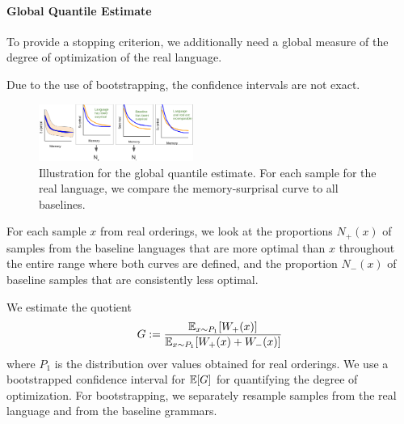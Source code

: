 \paragraph{Global Quantile Estimate}

To provide a stopping criterion, we additionally need a global measure of the degree of optimization of the real language.

Due to the use of bootstrapping, the confidence intervals are not exact.

\begin{figure}
	\begin{center}
\includegraphics[width=0.45\textwidth]{figures/quantile-global.png}
\end{center}
	\caption{Illustration for the global quantile estimate. For each sample for the real language, we compare the memory-surprisal curve to all baselines.}\label{fig:quantile-global}
\end{figure}



For each sample $x$ from real orderings, we look at the proportions $N_+(x)$ of samples from the baseline languages that are more optimal than $x$ throughout the entire range where both curves are defined, and the proportion $N_-(x)$ of baseline samples that are consistently less optimal.


We estimate the quotient
\begin{equation}\label{eq:g}
	G :=	\frac{\mathbb{E}_{x \sim P_1}[W_+(x)]}{\mathbb{E}_{x \sim P_1}[W_+(x) + W_-(x)]}
\end{equation}
where $P_1$ is the distribution over values obtained for real orderings.
We use a bootstrapped confidence interval for $\mathbb{E}[G]$ for quantifying the degree of optimization.
For bootstrapping, we separately resample samples from the real language and from the baseline grammars.



